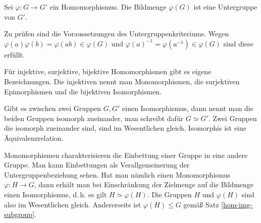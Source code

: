 \begin{Satz}\label{hom-img-subgroup}
Sei $\varphi\colon G\to G'$ ein Homomorphismus. Die Bildmenge
$\varphi(G)$ ist eine Untergruppe von $G'$.
\end{Satz}
 Zu prüfen sind die Voraussetzungen des
Untergruppenkriteriums. Wegen $\varphi(a)\varphi(b)
= \varphi(ab)\in\varphi(G)$ und $\varphi(a)^{-1}
= \varphi(a^{-1})\in\varphi(G)$ sind diese erfüllt.\;\qedsymbol

Für injektive, surjektive, bijektive Homomorphismen gibt es
eigene Bezeichnungen. Die injektiven nennt man Monomorphismen,
die surjektiven Epimorphismen und die bijektiven Isomorphismen.

Gibt es zwischen zwei Gruppen $G,G'$ einen Isomorphismus, dann nennt
man die beiden Gruppen isomorph zueinander, man schreibt dafür
$G\simeq G'$. Zwei Gruppen die isomorph zueinander sind, sind
im Wesentlichen gleich. Isomorphis ist eine Äquivalenzrelation.


Monomorphismen charakterisieren die Einbettung einer Gruppe
in eine andere Gruppe. Man kann Einbettungen als Verallgemeinerung
der Untergruppenbeziehung sehen. Hat man nämlich einen Monomorphismus
$\varphi\colon H\to G$, dann erhält man bei Einschränkung der
Zielmenge auf die Bildmenge einen Isomorphismus, d.\,h. es gilt
$H\simeq\varphi(H)$. Die Gruppen $H$ und $\varphi(H)$ sind also im
Wesentlichen gleich. Andererseits ist $\varphi(H)\le G$ gemäß Satz
\ref{hom-img-subgroup}.



